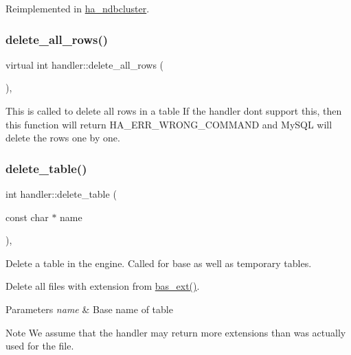 Reimplemented in \mbox{\hyperlink{classha__ndbcluster_a2285b3af9153f052ef6ba0cfc3bacea1}{ha\+\_\+ndbcluster}}.

\mbox{\label{classhandler_ac24fcaab09a75e81702c2e2c34fa0b62}} 
\subsubsection{\texorpdfstring{delete\+\_\+all\+\_\+rows()}{delete\_all\_rows()}}
{\footnotesize\ttfamily virtual int handler\+::delete\+\_\+all\+\_\+rows (\begin{DoxyParamCaption}{ }\end{DoxyParamCaption})\hspace{0.3cm}{\ttfamily [inline]}, {\ttfamily [virtual]}}

This is called to delete all rows in a table If the handler don\textquotesingle{}t support this, then this function will return H\+A\+\_\+\+E\+R\+R\+\_\+\+W\+R\+O\+N\+G\+\_\+\+C\+O\+M\+M\+A\+ND and My\+S\+QL will delete the rows one by one. \mbox{\label{classhandler_ae53ec34116b901cc08e5a87f5ec681a6}} 
\subsubsection{\texorpdfstring{delete\+\_\+table()}{delete\_table()}}
{\footnotesize\ttfamily int handler\+::delete\+\_\+table (\begin{DoxyParamCaption}\item[{const char $\ast$}]{name }\end{DoxyParamCaption})\hspace{0.3cm}{\ttfamily [protected]}, {\ttfamily [virtual]}}

Delete a table in the engine. Called for base as well as temporary tables.

Delete all files with extension from \mbox{\hyperlink{classhandler_a748d5e5b6dbbb0681cbac2ad881505c9}{bas\+\_\+ext()}}.


\begin{DoxyParams}{Parameters}
{\em name} & Base name of table\\
\hline
\end{DoxyParams}
\begin{DoxyNote}{Note}
We assume that the handler may return more extensions than was actually used for the file.
\end{DoxyNote}

